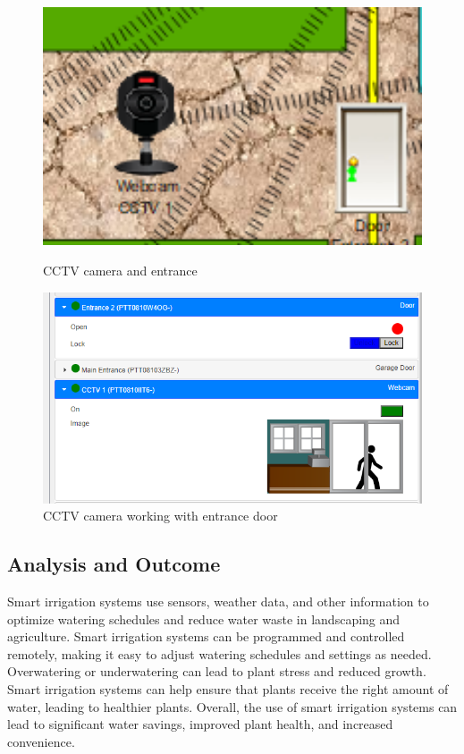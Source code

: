 \documentclass{report}
\begin{document}
\begin{figure}[h]

    \centering
   \begin{minipage}{0.40\textwidth}
    \centering
    \includegraphics[width=1\textwidth]{rs/6.png}
    \caption{CCTV camera and entrance}
    \label{fig:my_label}
    \end{minipage}
    \hfill
    \begin{minipage}{0.40\textwidth}
    \centering
    \includegraphics[width=1\textwidth]{rs/7.png}
    \caption{CCTV camera working with entrance door}
    \label{fig:my_label}
    \end{minipage}
\end{figure}
\vspace{0.5cm}
\subsection{Analysis and Outcome}
Smart irrigation systems use sensors, weather data, and other information to optimize watering schedules and reduce water waste in landscaping and agriculture. Smart irrigation systems can be programmed and controlled remotely, making it easy to adjust watering schedules and settings as needed. Overwatering or underwatering can lead to plant stress and reduced growth. Smart irrigation systems can help ensure that plants receive the right amount of water, leading to healthier plants. Overall, the use of smart irrigation systems can lead to significant water savings, improved plant health, and increased convenience.
\newpage
\end{document}
